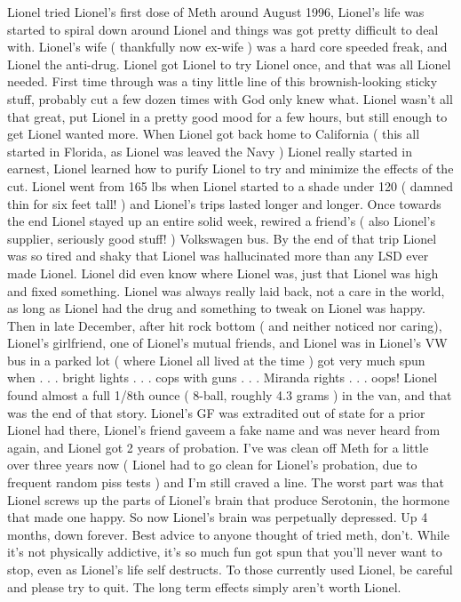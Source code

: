 \documentclass[12pt]{book}
\begin{document}
Lionel tried Lionel's first dose of Meth around August 1996, Lionel's life was started to spiral down around Lionel and things was got pretty difficult to deal with. Lionel's wife ( thankfully now ex-wife ) was a hard core speeded freak, and Lionel the anti-drug. Lionel got Lionel to try Lionel once, and that was all Lionel needed. First time through was a tiny little line of this brownish-looking sticky stuff, probably cut a few dozen times with God only knew what. Lionel wasn't all that great, put Lionel in a pretty good mood for a few hours, but still enough to get Lionel wanted more. When Lionel got back home to California ( this all started in Florida, as Lionel was leaved the Navy ) Lionel really started in earnest, Lionel learned how to purify Lionel to try and minimize the effects of the cut. Lionel went from 165 lbs when Lionel started to a shade under 120 ( damned thin for six feet tall! ) and Lionel's trips lasted longer and longer. Once towards the end Lionel stayed up an entire solid week, rewired a friend's ( also Lionel's supplier, seriously good stuff! ) Volkswagen bus. By the end of that trip Lionel was so tired and shaky that Lionel was hallucinated more than any LSD ever made Lionel. Lionel did even know where Lionel was, just that Lionel was high and fixed something. Lionel was always really laid back, not a care in the world, as long as Lionel had the drug and something to tweak on Lionel was happy. Then in late December, after hit rock bottom ( and neither noticed nor caring), Lionel's girlfriend, one of Lionel's mutual friends, and Lionel was in Lionel's VW bus in a parked lot ( where Lionel all lived at the time ) got very much spun when . . .  bright lights . . .  cops with guns . . .  Miranda rights . . .  oops! Lionel found almost a full 1/8th ounce ( 8-ball, roughly 4.3 grams ) in the van, and that was the end of that story. Lionel's GF was extradited out of state for a prior Lionel had there, Lionel's friend gaveem a fake name and was never heard from again, and Lionel got 2 years of probation. I've was clean off Meth for a little over three years now ( Lionel had to go clean for Lionel's probation, due to frequent random piss tests ) and I'm still craved a line. The worst part was that Lionel screws up the parts of Lionel's brain that produce Serotonin, the hormone that made one happy. So now Lionel's brain was perpetually depressed. Up 4 months, down forever. Best advice to anyone thought of tried meth, don't. While it's not physically addictive, it's so much fun got spun that you'll never want to stop, even as Lionel's life self destructs. To those currently used Lionel, be careful and please try to quit. The long term effects simply aren't worth Lionel.
\end{document}
